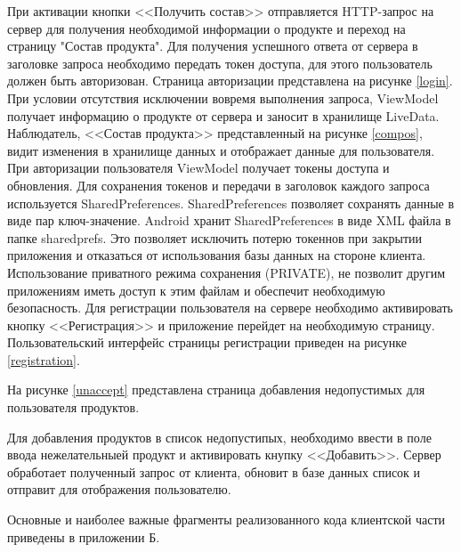 При активации кнопки <<Получить состав>> отправляется HTTP-запрос на сервер для получения необходимой информации о продукте и переход на страницу "Состав продукта". Для получения успешного ответа от сервера в заголовке запроса необходимо передать токен доступа, для этого пользователь должен быть авторизован. Страница авторизации представлена на рисунке \ref{login}.
При условии отсутствия исключении вовремя выполнения запроса, ViewModel получает информацию о продукте от сервера и заносит в хранилище LiveData. Наблюдатель, <<Состав продукта>> представленный на рисунке \ref{compos}, видит изменения в хранилище данных и отображает данные для пользователя. 
При авторизации пользователя ViewModel получает токены доступа и обновления. Для сохранения токенов и передачи в заголовок каждого запроса  используется SharedPreferences\cite{11}. SharedPreferences позволяет  сохранять данные в виде пар ключ-значение. Android хранит SharedPreferences в виде XML файла в папке sharedprefs. Это позволяет исключить потерю токеннов при закрытии приложения и отказаться от использования базы данных на стороне клиента. Использование приватного режима сохранения (PRIVATE), не позволит другим приложениям иметь доступ к этим файлам и обеспечит необходимую безопасность. Для регистрации пользователя на сервере необходимо активировать кнопку <<Регистрация>> и приложение перейдет на необходимую страницу. Пользовательский интерфейс страницы регистрации приведен на рисунке \ref{registration}.




На рисунке \ref{unaccept} представлена страница добавления  недопустимых для пользователя продуктов.


Для добавления продуктов в список недопустипых, необходимо ввести в поле ввода нежелательныей продукт и активировать кнупку <<Добавить>>.
Сервер обработает полученный запрос от клиента, обновит в базе данных список и отправит для отображения пользователю.

Основные и наиболее важные фрагменты реализованного кода клиентской части приведены в приложении Б. 

\clearpage
